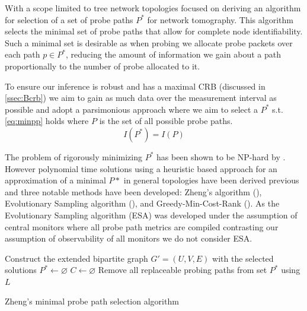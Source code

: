 With a scope limited to tree network topologies \cite{lawrence_network_2006} focused on deriving an algorithm for selection of a set of probe paths $P^*$ for network tomography. This algorithm selects the minimal set of probe paths that allow for complete node identifiability. Such a minimal set is desirable as when probing we allocate probe packets over each path $p\in P^*$, reducing the amount of information we gain about a path proportionally to the number of probe allocated to it.\par
To ensure our inference is robust and has a maximal CRB (discussed in \cref{ssec:Bcrb}) we aim to gain as much data over the measurement interval as possible and adopt a parsimonious approach where we aim to select a $P^*$ s.t. \cref{eq:minpp} holds where $P$ is the set of all possible probe paths.
\begin{equation}
\label{eq:minpp}
    I(P^*) = I(P)
\end{equation}
\par
The problem of rigorously minimizing $P^*$ has been shown to be NP-hard by \cite{zheng_minimizing_2013}. However polynomial time solutions using a heuristic based approach for an approximation of a minimal $P*$ in general topologies have been derived previous and three notable methods have been developed: Zheng's algorithm (\cite{zheng_minimizing_2013}), Evolutionary Sampling algorithm (\cite{rahali_unicast_2019}), and Greedy-Min-Cost-Rank (\cite{tootaghaj_parsimonious_2018}). As the Evolutionary Sampling algorithm (ESA) was developed under the assumption of central monitors where all probe path metrics are compiled contrasting our assumption of observability of all monitors we do not consider ESA.\par
\begin{algorithm}
    
    Construct the extended bipartite graph $G'=(U,V,E)$ with the selected solutions\;
    $P^* \gets \varnothing$ \;
    $C \gets \varnothing$ \;
    Remove all replaceable probing paths from set $P^*$ using $L$\;
    \caption{Zheng's minimal probe path selection algorithm}
    \label{alg:zhengs}
\end{algorithm}

